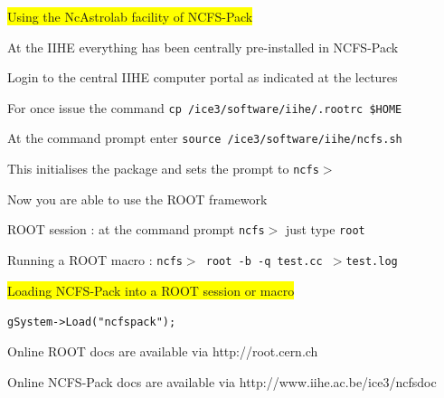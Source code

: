 \Tr
\onecolumn
\begin{center}
\colorbox{yellow}{Using the NcAstrolab facility of NCFS-Pack}
\end{center}
%
\begin{itemize}
\item At the {\blue IIHE} everything has been centrally pre-installed in {\blue NCFS-Pack}
\item[] Login to the central IIHE computer portal as indicated at the lectures
\item[] For once issue the command {\blue \tt cp /ice3/software/iihe/.rootrc \$HOME}
\item[] At the command prompt enter {\blue \tt source /ice3/software/iihe/ncfs.sh}
\item[] This initialises the package and sets the prompt to {\blue \tt ncfs$>$} 
{\red
\item[$\ast$] Now you are able to use the ROOT framework
}
\item[] ROOT session : at the command prompt {\blue \tt ncfs$>$} just type {\blue \tt root}
\item[] Running a ROOT macro : {\blue \tt ncfs$>$ root -b -q test.cc $>$test.log}
\item \colorbox{yellow}{Loading NCFS-Pack into a ROOT session or macro}
\item[] {\blue \tt gSystem->Load("ncfspack");}
\item Online ROOT docs are available via http://root.cern.ch
\item Online NCFS-Pack docs are available via http://www.iihe.ac.be/ice3/ncfsdoc
\end{itemize}

